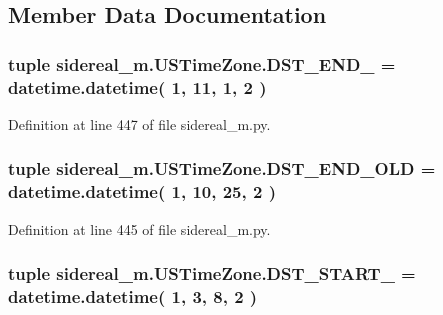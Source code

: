 \subsection{Member Data Documentation}
\hypertarget{classsidereal__m_1_1_u_s_time_zone_a0e6a05ecb7c04617f48bd6e60b7ea2fa}{
\subsubsection[{D\-S\-T\-\_\-\-E\-N\-D\-\_\-2007}]{\setlength{\rightskip}{0pt plus 5cm}tuple sidereal\-\_\-m.\-U\-S\-Time\-Zone.\-D\-S\-T\-\_\-\-E\-N\-D\-\_ = datetime.\-datetime( 1, 11, 1, 2 )\hspace{0.3cm}{\ttfamily [static]}}}\label{classsidereal__m_1_1_u_s_time_zone_a0e6a05ecb7c04617f48bd6e60b7ea2fa}


Definition at line 447 of file sidereal\-\_\-m.\-py.

\hypertarget{classsidereal__m_1_1_u_s_time_zone_a554202ecc84ef01c660b7b710bbc8516}{
\subsubsection[{D\-S\-T\-\_\-\-E\-N\-D\-\_\-\-O\-L\-D}]{\setlength{\rightskip}{0pt plus 5cm}tuple sidereal\-\_\-m.\-U\-S\-Time\-Zone.\-D\-S\-T\-\_\-\-E\-N\-D\-\_\-\-O\-L\-D = datetime.\-datetime( 1, 10, 25, 2 )\hspace{0.3cm}{\ttfamily [static]}}}\label{classsidereal__m_1_1_u_s_time_zone_a554202ecc84ef01c660b7b710bbc8516}


Definition at line 445 of file sidereal\-\_\-m.\-py.

\hypertarget{classsidereal__m_1_1_u_s_time_zone_af47f8086731af5141d70e129f783bd2d}{
\subsubsection[{D\-S\-T\-\_\-\-S\-T\-A\-R\-T\-\_\-2007}]{\setlength{\rightskip}{0pt plus 5cm}tuple sidereal\-\_\-m.\-U\-S\-Time\-Zone.\-D\-S\-T\-\_\-\-S\-T\-A\-R\-T\-\_ = datetime.\-datetime( 1, 3, 8, 2 )\hspace{0.3cm}{\ttfamily [static]}}}\label{classsidereal__m_1_1_u_s_time_zone_af47f8086731af5141d70e129f783bd2d}


